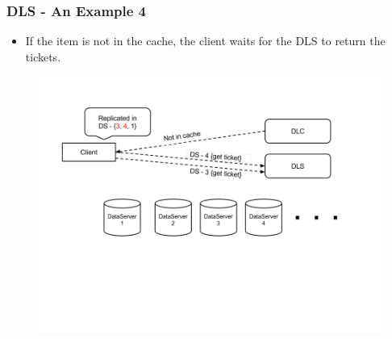 \documentclass{beamer}
\begin{document}
\begin{frame}
  \frametitle{DLS - An Example 4}
  \begin{itemize}
  \item If the item is not in the cache, the client waits for the DLS to
    return the tickets.
  \end{itemize}
  \begin{figure}
    \begin{center}
      \centerline{\includegraphics[scale=0.40]{img/DLS_Example5.png}}
    \end{center}
  \end{figure}

\end{frame}
\end{document}
